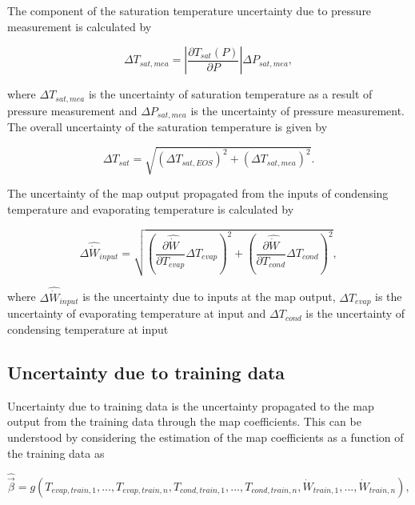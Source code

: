 The component of the saturation temperature uncertainty due to pressure measurement is calculated by

\begin{equation}
\Delta {T_{sat,mea}} = \left|\frac{{\partial {T_{sat}}({P})}}{{\partial {P}}}\right|\Delta {P_{sat,mea}},
\label{eq:uncer_t_mea}
\end{equation}

where $\Delta {T_{sat,mea}}$ is the uncertainty of saturation temperature as a result of pressure measurement and $\Delta P_{sat,mea}$ is the uncertainty of pressure measurement. The overall uncertainty of the saturation temperature is given by 

\begin{equation}
\Delta {T_{sat}} = \sqrt {{{(\Delta {T_{sat,EOS}})}^2} + {{(\Delta {T_{sat,mea}})}^2}} .
\label{eq:uncer_t}
\end{equation}

The uncertainty of the map output propagated from the inputs of condensing temperature and evaporating temperature is calculated by

\begin{equation}
\Delta {\hat{\dot{W}}_{input}} = \sqrt {{\left(\frac{{\partial \hat{\dot{W}}}}{{\partial {T_{evap}}}}\Delta {T_{evap}}\right)^2} + {\left(\frac{{\partial \hat{\dot{W}}}}{{\partial {T_{cond}}}}\Delta {T_{cond}}\right)^2}}, 
\label{eq:uncer_w_input}
\end{equation}

where $\Delta {\hat{\dot{W}}_{input}}$ is the uncertainty due to inputs at the map output, $\Delta {T_{evap}}$ is the uncertainty of evaporating temperature at input and $\Delta T_{cond}$ is the uncertainty of condensing temperature at input

\subsection{Uncertainty due to training data} \label{subsec:uncer_train}
Uncertainty due to training data is the uncertainty propagated to the map output from the training data through the map coefficients. This can be understood by considering the estimation of the map coefficients as a function of the training data as

\begin{equation}
\hat{ \vec {\beta}}  = g({T_{evap,train,1}},...,{T_{evap,train,n}},{T_{cond,train,1}},...,{T_{cond,train,n}},{\dot{W}_{train,1}},...,{\dot{W}_{train,n}}), 
\label{eq:beta_train}
\end{equation}

